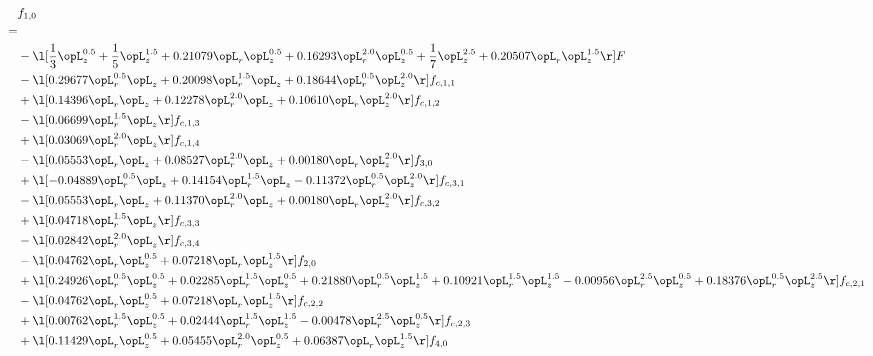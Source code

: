 \begin{alignat}{2} 
\label{eq:f_10_2} 
& f_{1,0} \nonumber \\ 
 = \\ 
& - \l[ \frac{1}{3} \opL_z^{0.5} + \frac{1}{5} \opL_z^{1.5} +  0.21079 \opL_r \opL_z^{0.5} +  0.16293 \opL_r^{2.0} \opL_z^{0.5} + \frac{1}{7} \opL_z^{2.5} +  0.20507 \opL_r \opL_z^{1.5}  \r] F \nonumber \\ 
& - \l[  0.29677 \opL_r^{0.5} \opL_z +  0.20098 \opL_r^{1.5} \opL_z +  0.18644 \opL_r^{0.5} \opL_z^{2.0}  \r] f_{c,1,1} \nonumber \\ 
& + \l[  0.14396 \opL_r \opL_z +  0.12278 \opL_r^{2.0} \opL_z +  0.10610 \opL_r \opL_z^{2.0}  \r] f_{c,1,2} \nonumber \\ 
& - \l[  0.06699 \opL_r^{1.5} \opL_z  \r] f_{c,1,3} \nonumber \\ 
& + \l[  0.03069 \opL_r^{2.0} \opL_z  \r] f_{c,1,4} \nonumber \\ 
& - \l[  0.05553 \opL_r \opL_z +  0.08527 \opL_r^{2.0} \opL_z +  0.00180 \opL_r \opL_z^{2.0}  \r] f_{3,0} \nonumber \\ 
& + \l[  -0.04889 \opL_r^{0.5} \opL_z +  0.14154 \opL_r^{1.5} \opL_z   -0.11372 \opL_r^{0.5} \opL_z^{2.0}  \r] f_{c,3,1} \nonumber \\ 
& - \l[  0.05553 \opL_r \opL_z +  0.11370 \opL_r^{2.0} \opL_z +  0.00180 \opL_r \opL_z^{2.0}  \r] f_{c,3,2} \nonumber \\ 
& + \l[  0.04718 \opL_r^{1.5} \opL_z  \r] f_{c,3,3} \nonumber \\ 
& - \l[  0.02842 \opL_r^{2.0} \opL_z  \r] f_{c,3,4} \nonumber \\ 
& - \l[  0.04762 \opL_r \opL_z^{0.5} +  0.07218 \opL_r \opL_z^{1.5}  \r] f_{2,0} \nonumber \\ 
& + \l[  0.24926 \opL_r^{0.5} \opL_z^{0.5} +  0.02285 \opL_r^{1.5} \opL_z^{0.5} +  0.21880 \opL_r^{0.5} \opL_z^{1.5} +  0.10921 \opL_r^{1.5} \opL_z^{1.5}   -0.00956 \opL_r^{2.5} \opL_z^{0.5} +  0.18376 \opL_r^{0.5} \opL_z^{2.5}  \r] f_{c,2,1} \nonumber \\ 
& - \l[  0.04762 \opL_r \opL_z^{0.5} +  0.07218 \opL_r \opL_z^{1.5}  \r] f_{c,2,2} \nonumber \\ 
& + \l[  0.00762 \opL_r^{1.5} \opL_z^{0.5} +  0.02444 \opL_r^{1.5} \opL_z^{1.5}   -0.00478 \opL_r^{2.5} \opL_z^{0.5}  \r] f_{c,2,3} \nonumber \\ 
& + \l[  0.11429 \opL_r \opL_z^{0.5} +  0.05455 \opL_r^{2.0} \opL_z^{0.5} +  0.06387 \opL_r \opL_z^{1.5}  \r] f_{4,0} \nonumber \\ 

\end{alignat}

